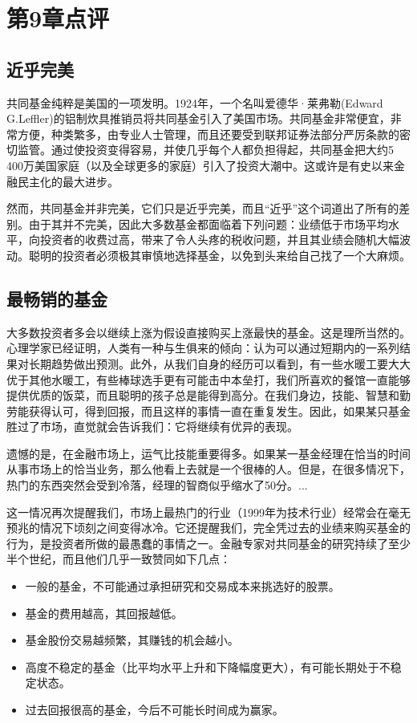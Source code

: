 \documentclass[12pt,oneside]{book}
\begin{document}
\section{第9章点评}
\subsection{近乎完美}
共同基金纯粹是美国的一项发明。1924年，一个名叫爱德华·莱弗勒(Edward G.Leffler)的铝制炊具推销员将共同基金引入了美国市场。共同基金非常便宜，非常方便，种类繁多，由专业人士管理，而且还要受到联邦证券法部分严厉条款的密切监管。通过使投资变得容易，并使几乎每个人都负担得起，共同基金把大约5 400万美国家庭（以及全球更多的家庭）引入了投资大潮中。这或许是有史以来金融民主化的最大进步。

然而，共同基金并非完美，它们只是近乎完美，而且“近乎”这个词道出了所有的差别。由于其并不完美，因此大多数基金都面临着下列问题：业绩低于市场平均水平，向投资者的收费过高，带来了令人头疼的税收问题，并且其业绩会随机大幅波动。聪明的投资者必须极其审慎地选择基金，以免到头来给自己找了一个大麻烦。

\subsection{最畅销的基金}
大多数投资者多会以继续上涨为假设直接购买上涨最快的基金。这是理所当然的。心理学家已经证明，人类有一种与生俱来的倾向：认为可以通过短期内的一系列结果对长期趋势做出预测。此外，从我们自身的经历可以看到，有一些水暖工要大大优于其他水暖工，有些棒球选手更有可能击中本垒打，我们所喜欢的餐馆一直能够提供优质的饭菜，而且聪明的孩子总是能得到高分。在我们身边，技能、智慧和勤劳能获得认可，得到回报，而且这样的事情一直在重复发生。因此，如果某只基金胜过了市场，直觉就会告诉我们：它将继续有优异的表现。

遗憾的是，在金融市场上，运气比技能重要得多。如果某一基金经理在恰当的时间从事市场上的恰当业务，那么他看上去就是一个很棒的人。但是，在很多情况下，热门的东西突然会受到冷落，经理的智商似乎缩水了50分。...

这一情况再次提醒我们，市场上最热门的行业（1999年为技术行业）经常会在毫无预兆的情况下顷刻之间变得冰冷。它还提醒我们，完全凭过去的业绩来购买基金的行为，是投资者所做的最愚蠢的事情之一。金融专家对共同基金的研究持续了至少半个世纪，而且他们几乎一致赞同如下几点：

\begin{itemize}
\item 一般的基金，不可能通过承担研究和交易成本来挑选好的股票。
\item 基金的费用越高，其回报越低。
\item 基金股份交易越频繁，其赚钱的机会越小。
\item 高度不稳定的基金（比平均水平上升和下降幅度更大），有可能长期处于不稳定状态。
\item 过去回报很高的基金，今后不可能长时间成为赢家。
\end{itemize}
\end{document}
